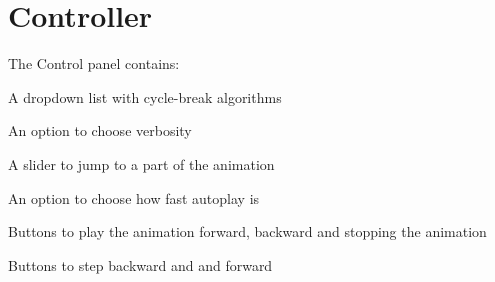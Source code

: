 \section{Controller}
The Control panel contains:
\begin{list}{-}{}
\item A dropdown list with cycle-break algorithms
\item An option to choose verbosity
\item A slider to jump to a part of the animation
\item An option to choose how fast autoplay is
\item Buttons to play the animation forward, backward and stopping the animation
\item Buttons to step backward and and forward

\end{list}




